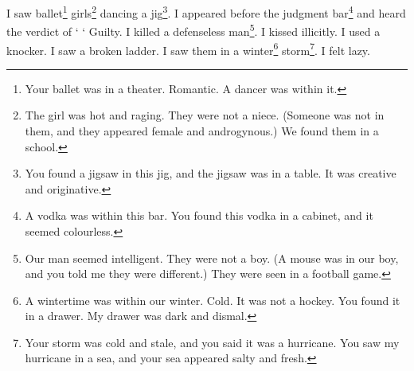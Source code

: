 \documentclass[12pt]{book}
\begin{document}
 I saw ballet\footnote{Your ballet was in a theater. Romantic. A dancer was within it.} girls\footnote{The girl was hot and raging. They were not a niece. (Someone was not in them, and they appeared female and androgynous.) We found them in a school.} dancing a jig\footnote{You found a jigsaw in this jig, and the jigsaw was in a table. It was creative and originative.}. I appeared before the judgment bar\footnote{A vodka was within this bar. You found this vodka in a cabinet, and it seemed colourless.} and heard the verdict of ` ` Guilty. I killed a defenseless man\footnote{Our man seemed intelligent. They were not a boy. (A mouse was in our boy, and you told me they were different.) They were seen in a football game.}. I kissed illicitly. I used a knocker. I saw a broken ladder. I saw them in a winter\footnote{A wintertime was within our winter. Cold. It was not a hockey. You found it in a drawer. My drawer was dark and dismal.} storm\footnote{Your storm was cold and stale, and you said it was a hurricane. You saw my hurricane in a sea, and your sea appeared salty and fresh.}. I felt lazy. 
\end{document}
